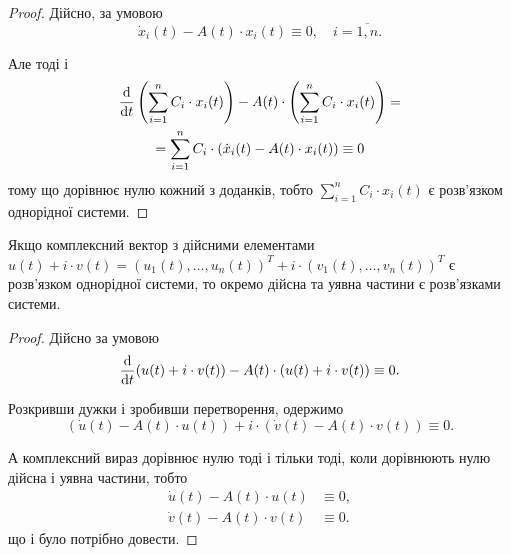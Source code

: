 \begin{proof}
	Дійсно, за умовою
	\begin{equation*}
		\dot x_i(t) - A(t) \cdot x_i(t) \equiv 0, \quad i = \overline{1, n}.
	\end{equation*}
	
	Але тоді і
	\begin{multline*}
		\frac{\mathop{}\!\mathrm{d}}{\mathop{}\!\mathrm{d} t} \left( \sum_{i=1}^n C_i \cdot x_i(t) \right) - A(t) \cdot \left( \sum_{i = 1}^n C_i \cdot x_i(t) \right) = \\ = \sum_{i = 1}^n C_i \cdot \left( \dot x_i(t) - A(t) \cdot x_i(t) \right) \equiv 0
	\end{multline*}
	тому що дорівнює нулю кожний з доданків, тобто $\sum_{i=1}^n C_i \cdot x_i(t)$ є роз\-в'яз\-ком однорідної системи.
\end{proof}

\begin{property}
	Якщо комплексний вектор з дійсними елементами $u(t) + i \cdot v(t) = (u_1(t), \ldots, u_n(t))^T + i \cdot (v_1(t), \ldots, v_n(t))^T$ є розв’язком однорідної системи, то окремо дійсна та уявна частини є розв'язками системи.
\end{property}

\begin{proof}
	Дійсно за умовою
	\begin{equation*}
		\frac{\mathop{}\!\mathrm{d}}{\mathop{}\!\mathrm{d} t} (u(t) + i \cdot v(t)) - A(t) \cdot (u(t) + i \cdot v(t)) \equiv 0.
	\end{equation*}

	Розкривши дужки і зробивши перетворення, одержимо
	\begin{equation*}
		(\dot u(t) - A(t) \cdot u(t)) + i \cdot (\dot v(t) - A(t) \cdot v(t)) \equiv 0.
	\end{equation*}
	 
	А комплексний вираз дорівнює нулю тоді і тільки тоді, коли дорівнюють нулю дійсна і уявна частини, тобто
	\begin{align*}
		\dot u(t) - A(t) \cdot u(t) &\equiv 0, \\
		\dot v(t) - A(t) \cdot v(t) &\equiv 0.
	\end{align*}
	що і було потрібно довести.
\end{proof}

